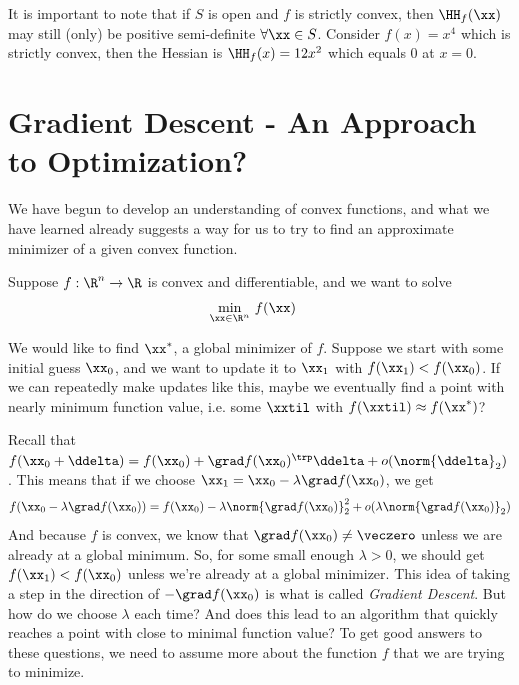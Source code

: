 \begin{remark}
It is important to note that if $S$ is open and $f$ is strictly
convex, then $\HH_{f}(\xx)$ may still (only) be positive semi-definite
$\forall \xx \in S$. Consider $f(x) = x^4$ which is strictly convex,
then the Hessian is $\HH_{f}(x) = 12x^2$ which equals 0 at $x = 0$.
\end{remark}

\section{Gradient Descent - An Approach to Optimization?}

We have begun to develop an understanding of convex functions, and
what we have learned already suggests a way for us to try to find an
approximate minimizer of a given convex function.

Suppose $f : \R^n \to \R$ is convex and differentiable, and we want to
solve
\begin{align*}
\min_{\xx \in \R^n} & \ f(\xx)
\end{align*}

We would like to find $\xx^*$, a global minimizer of $f$.
Suppose we start with some initial guess  $\xx_0$,
and we want to update it to $\xx_1$ with $f(\xx_1) < f(\xx_0)$.
If we can repeatedly make updates like this, maybe we eventually
find a point with nearly minimum function value, i.e. some $\xxtil$ with $f(\xxtil) \approx f(\xx^*)$?

Recall that $f(\xx_0+\ddelta) = f(\xx_0) + \grad f(\xx_0)^\trp\ddelta +
o(\norm{\ddelta}_2)$.
This means that if we choose
${\xx_1 = \xx_0 - \lambda \grad f(\xx_0)}$, we get
\[
  f(\xx_0 - \lambda \grad f(\xx_0)) =
  f(\xx_0) -\lambda \norm{\grad f(\xx_0)}_2^2 + o(\lambda \norm{\grad f(\xx_0)}_2)
\]
And because $f$ is convex, we know that $\grad f(\xx_0) \neq \veczero$
unless we are already at a global minimum.
So, for some small enough $\lambda > 0$, we should get $f(\xx_1) <
f(\xx_0)$ unless we're already at a global minimizer.
This idea of taking a step in the direction of $-\grad f(\xx_0)$ is
what is called \emph{Gradient Descent}.
But how do we choose $\lambda$ each time? And
does this lead to an algorithm that quickly reaches a point with close to minimal function value?
To get good answers to these questions, we need to assume more about
the function $f$ that we are trying to minimize.

